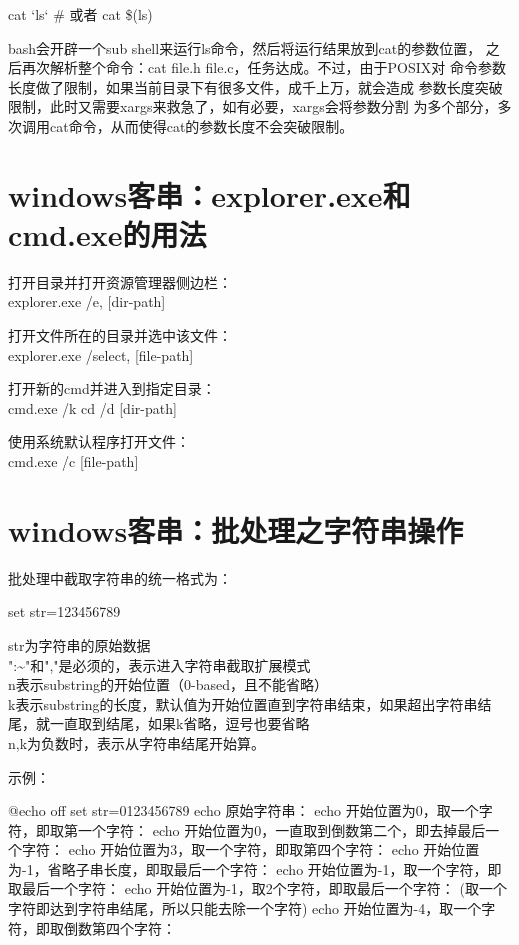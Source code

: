 \documentclass[a4paper,11pt]{article}
\begin{document}
  \begin{bashcode}
    cat `ls`
    # 或者
    cat \$(ls)
  \end{bashcode}

  bash会开辟一个sub shell来运行ls命令，然后将运行结果放到cat的参数位置，
  之后再次解析整个命令：cat file.h file.c，任务达成。不过，由于POSIX对
  命令参数长度做了限制，如果当前目录下有很多文件，成千上万，就会造成
  参数长度突破限制，此时又需要xargs来救急了，如有必要，xargs会将参数分割
  为多个部分，多次调用cat命令，从而使得cat的参数长度不会突破限制。

  \section[Windows客串：explorer.exe和cmd.exe的用法]{windows客串：explorer.exe和cmd.exe的用法}
  打开目录并打开资源管理器侧边栏：\\
  explorer.exe /e, [dir-path]

  打开文件所在的目录并选中该文件：\\
  explorer.exe /select, [file-path]

  打开新的cmd并进入到指定目录：\\
  cmd.exe /k cd /d [dir-path]

  使用系统默认程序打开文件：\\
  cmd.exe /c [file-path]

  \section[Windows客串：批处理-字符串操作]{windows客串：批处理之字符串操作}
  批处理中截取字符串的统一格式为：

  \begin{bashcode}
    set str=123456789
  \end{bashcode}

  str为字符串的原始数据\\
  ":\~{}"和","是必须的，表示进入字符串截取扩展模式\\
  n表示substring的开始位置（0-based，且不能省略）\\
  k表示substring的长度，默认值为开始位置直到字符串结束，如果超出字符串结尾，就一直取到结尾，如果k省略，逗号也要省略\\
  n,k为负数时，表示从字符串结尾开始算。


  示例：\par
  \begin{bashcode}
    @echo off
    set str=0123456789
    echo 原始字符串：%
    echo 开始位置为0，取一个字符，即取第一个字符：%
    echo 开始位置为0，一直取到倒数第二个，即去掉最后一个字符：%
    echo 开始位置为3，取一个字符，即取第四个字符：%
    echo 开始位置为-1，省略子串长度，即取最后一个字符：%
    echo 开始位置为-1，取一个字符，即取最后一个字符：%
    echo 开始位置为-1，取2个字符，即取最后一个字符：%
    (取一个字符即达到字符串结尾，所以只能去除一个字符)
    echo 开始位置为-4，取一个字符，即取倒数第四个字符：%
  \end{bashcode}
\end{document}
